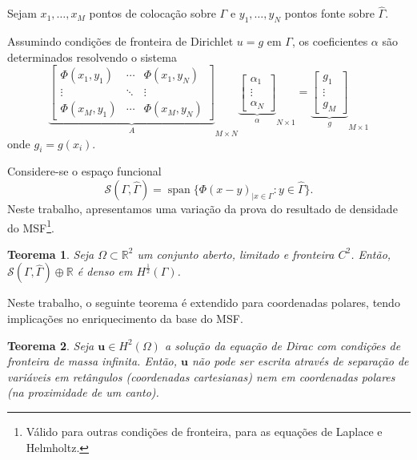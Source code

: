 \documentclass[portuguese,notheorems]{beamer}
\newtheorem{theorem}{Teorema}
\DeclareMathOperator{\Span}{span}
\begin{document}
\begin{frame}
    Sejam \(x_1,\ldots,x_M\) pontos de colocação sobre \(\Gamma\) e \(y_1,\ldots,y_N\) pontos fonte sobre \(\hat{\Gamma}\).

    Assumindo condições de fronteira de Dirichlet \(u=g\) em \(\Gamma\), os coeficientes \(\alpha\) são determinados resolvendo o sistema
    \begin{equation}
    {\underbrace{\begin{bmatrix}
        \Phi(x_1, y_1) & \cdots & \Phi(x_1, y_N) \\
        \vdots & \ddots & \vdots \\
        \Phi(x_M, y_1) & \cdots & \Phi(x_M, y_N)
    \end{bmatrix}}_{A}}_{M\times N}
    {\underbrace{\begin{bmatrix}
        \alpha_1\\
        \vdots\\
        \alpha_N
    \end{bmatrix}}_\alpha}_{N\times 1}
    =
    {\underbrace{\begin{bmatrix}
        g_1\\
        \vdots\\
        g_M
    \end{bmatrix}}_g}_{M\times 1}
\end{equation}
    onde \(g_i = g(x_i)\).
\end{frame}

\begin{frame}
    Considere-se o espaço funcional
        \[
        \mathcal{S}(\Gamma, \hat{\Gamma}) = \Span\{\Phi(x-y)_{|x \in \Gamma} : y \in \hat{\Gamma}\}.
        \]
    Neste trabalho, apresentamos uma variação da prova do resultado de densidade do MSF\footnote{Válido para outras condições de fronteira, para as equações de Laplace e Helmholtz.}.

    \pause
    \begin{theorem}
        Seja \(\Omega \subset \mathbb{R}^2\) um conjunto aberto, limitado e fronteira \(C^2\). Então, \(\mathcal{S}(\Gamma, \hat{\Gamma}) \oplus \mathbb{R}\) é denso em \(H^\frac{1}{2}(\Gamma)\).
    \end{theorem}
\end{frame}

\begin{frame}
    Neste trabalho, o seguinte teorema é extendido para coordenadas polares, tendo implicações no enriquecimento da base do MSF.

    \begin{theorem}
        Seja \(\mathbf{u}\in H^2(\Omega)\) a solução da equação de Dirac com condições de fronteira de massa infinita. Então, \(\mathbf{u}\) não pode ser escrita através de separação de variáveis em retângulos (coordenadas cartesianas) nem em coordenadas polares (na proximidade de um canto).
    \end{theorem}
\end{frame}
\end{document}
